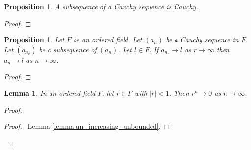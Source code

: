 \documentclass{article}
\let\qed\relax
\newtheorem{lemma}[axiom]{Lemma}
\newtheorem{proposition}[axiom]{Proposition}
\theoremstyle{definition}
\begin{document}
    \begin{proposition}
        A subsequence of a Cauchy sequence is Cauchy.
    \end{proposition}

    \begin{proof}
        \pf
        \qed
    \end{proof}

    \begin{proposition}
        \label{proposition:Cauchy_subsequence_converges}
        Let $F$ be an ordered field. Let $(a_n)$ be a Cauchy sequence in $F$. Let $(a_{n_r})$ be a
        subsequence of $(a_n)$. Let $l \in F$. If $a_{n_r} \rightarrow l$ as $r \rightarrow \infty$
        then $a_n \rightarrow l$ as $n \rightarrow \infty$.
    \end{proposition}

    \begin{proof}
        \pf
        \qed
    \end{proof}

    \begin{lemma}
        \label{lemma:rn_limit_zero}
        In an ordered field $F$, let $r \in F$ with $|r| < 1$.
        Then $r^n \rightarrow 0$ as $n \rightarrow \infty$.
    \end{lemma}

    \begin{proof}
        \pf
        \begin{proof}
            \pf\ Lemma \ref{lemma:un_increasing_unbounded}.
        \end{proof}
        \qed
    \end{proof}
\end{document}
